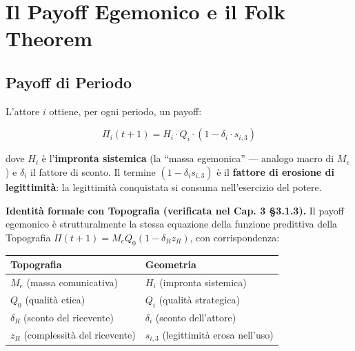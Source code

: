 \section{Il Payoff Egemonico e il Folk
Theorem}\label{il-payoff-egemonico-e-il-folk-theorem}

\subsection{Payoff di Periodo}\label{payoff-di-periodo}

L'attore \(i\) ottiene, per ogni periodo, un payoff:

\[
\Pi_i(t+1) = H_i \cdot Q_i \cdot (1 - \delta_i \cdot s_{i,3})
\]

dove \(H_i\) è l'\textbf{impronta sistemica} (la ``massa egemonica'' ---
analogo macro di \(M_e\)) e \(\delta_i\) il fattore di sconto. Il
termine \((1 - \delta_i s_{i,3})\) è il \textbf{fattore di erosione di
legittimità}: la legittimità conquistata si consuma nell'esercizio del
potere.

\Proved{} \textbf{Identità formale con Topografia (verificata nel Cap. 3
\S{}3.1.3).} Il payoff egemonico è strutturalmente la stessa equazione
della funzione predittiva della Topografia
\(\Pi(t+1) = M_e Q_0 (1 - \delta_R z_R)\), con corrispondenza:

{\def\LTcaptype{none} %
{\small\begin{longtable}[]{@{}
  >{\raggedright\arraybackslash}p{}
  >{\raggedright\arraybackslash}p{}@{}}
\toprule\noalign{}
\begin{minipage}[b]{\linewidth}\raggedright
Topografia
\end{minipage} & \begin{minipage}[b]{\linewidth}\raggedright
Geometria
\end{minipage} \\
\midrule\noalign{}
\endhead
\bottomrule\noalign{}
\endlastfoot
\(M_e\) (massa comunicativa) & \(H_i\) (impronta sistemica) \\
\(Q_0\) (qualità etica) & \(Q_i\) (qualità strategica) \\
\(\delta_R\) (sconto del ricevente) & \(\delta_i\) (sconto
dell'attore) \\
\(z_R\) (complessità del ricevente) & \(s_{i,3}\) (legittimità erosa
nell'uso) \\
\end{longtable}}
}

